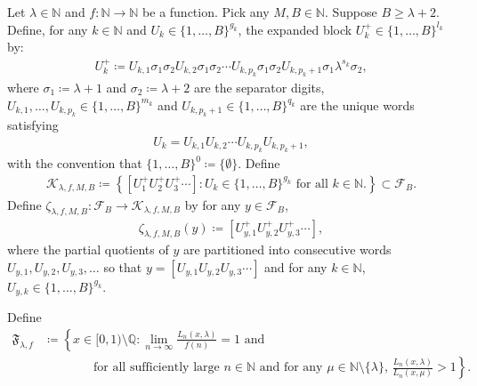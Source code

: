 \documentclass[10pt,a4paper]{amsart}
\begin{document}
Let $\lambda\in\mathbb{N}$ and $f:\mathbb{N}\to\mathbb{N}$ be a function. Pick any $M,B\in\mathbb{N}$. Suppose $B\geq\lambda+2$.
Define, for any $k\in\mathbb N$ and $U_k\in\{1,\dots,B\}^{g_k}$, the expanded block $U^+_k\in\{1,\dots,B\}^{l_k}$ by:
\begin{align*}
    U^+_k
    \coloneqq
    U_{k,1}\sigma_1\sigma_2U_{k,2}\sigma_1\sigma_2\cdots U_{k,p_k}\sigma_1\sigma_2U_{k,p_k+1}\sigma_1\lambda^{s_k}\sigma_2,
\end{align*}
where $\sigma_1\coloneqq \lambda+1$ and $\sigma_2\coloneqq \lambda+2$ are the separator digits, $U_{k,1},\dots,U_{k,p_k}\in \{1,\dots,B\}^{m_k}$ and $U_{k,p_k+1}\in \{1,\dots,B\}^{q_k}$ are the unique words satisfying 
\begin{align*}
    U_k=U_{k,1}U_{k,2}\cdots U_{k,p_k}U_{k,p_k+1},
\end{align*}
with the convention that $\{1,\ldots,B\}^0\coloneqq \{\emptyset\}$. Define
\begin{align*}
    \mathcal{K}_{\lambda,f,M,B}
    \coloneqq\left\{\left[U^+_1U^+_2U^+_3\cdots\right]:
    U_k\in\{1,\dots,B\}^{g_k}\text{ for all $k\in\mathbb{N}$.}\right\}
    \subset\mathcal{F}_B.
\end{align*}
Define $\zeta_{\lambda,f,M,B}:\mathcal{F}_B\to\mathcal{K}_{\lambda,f,M,B}$ by for any $y\in \mathcal{F}_B$,
\begin{align*}
    \zeta_{\lambda,f,M,B}(y)
    \coloneqq\left[U^+_{y,1}U^+_{y,2}U^+_{y,3}\cdots\right],
\end{align*}
where the partial quotients of $y$ are partitioned into consecutive words $U_{y,1},U_{y,2},U_{y,3},\ldots$ so that $y=[U_{y,1}U_{y,2}U_{y,3}\cdots]$ and for any $k\in\mathbb{N}$, $U_{y,k}\in\{1,\dots,B\}^{g_k}$. 

Define
\begin{align*}
    \mathfrak{F}_{\lambda,f}
    &\coloneqq
    \left\{x\in[0,1)\setminus\mathbb{Q}:
    \lim_{n\to\infty}\frac{L_n(x,\lambda)}{f(n)}=1
    \text{ and }\right.\\
    &\qquad\qquad\left.\text{for all sufficiently large $n\in\mathbb{N}$ and for any $\mu\in\mathbb{N}\setminus\{\lambda\}$, }\frac{L_n(x,\lambda)}{L_n(x,\mu)}>1\right\}.
\end{align*}
\end{document}
